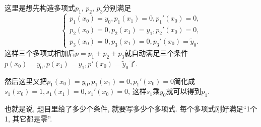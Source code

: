 \documentclass[hidelinks]{ctexart}
\begin{document}
这里是想先构造多项式$p_1$, $p_2$, $p_3$分别满足
\[ \begin{cases}
    p_1(x_0) = y_0, p_1(x_1) = 0, p_1'(x_0) = 0, \\
p_2(x_0) = 0, p_2(x_1) = y_1, p_2'(x_0) = 0, \\
p_3(x_0) = 0, p_3(x_1) = 0, p_3'(x_0) = \tilde{y}_0.
\end{cases} \]
这样三个多项式相加后$p=p_1+p_2+p_3$就自动满足三个条件$p(x_0) = y_0, p(x_1) = y_1, p'(x_0) = \tilde{y}_0$了.
\par
然后这里又把$p_1(x_0) = y_0, p_1(x_1) = 0, p_1'(x_0) = 0$简化成$s_1(x_0) = 1, s_1(x_1) = 0, s_1'(x_0) = 0$, 这样$s_1$乘$y_0$就可以得到$p_1$.
\par
也就是说, 题目里给了多少个条件, 就要写多少个多项式. 每个多项式刚好满足``1个1, 其它都是零''.
\end{document}
